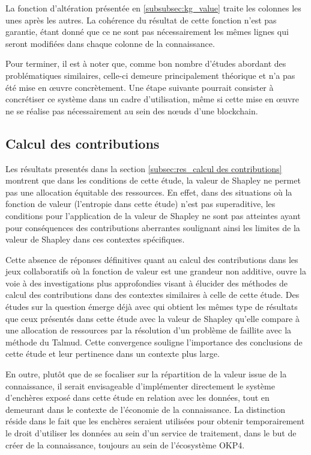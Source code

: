 La fonction d'altération présentée en \ref{subsubsec:kg_value} traite les colonnes les unes après les autres. La cohérence du résultat de cette fonction n'est pas garantie, étant donné que ce ne sont pas nécessairement les mêmes lignes qui seront modifiées dans chaque colonne de la connaissance.

Pour terminer, il est à noter que, comme bon nombre d'études abordant des problématiques similaires, celle-ci demeure principalement théorique et n'a pas été mise en œuvre concrètement. Une étape suivante pourrait consister à concrétiser ce système dans un cadre d'utilisation, même si cette mise en œuvre ne se réalise pas nécessairement au sein des nœuds d'une blockchain.


\subsection{Calcul des contributions} \label{subsec: discuss_contrib}


Les résultats presentés dans la section \ref{subsec:res_calcul des contributions} montrent que dans les conditions de cette étude, la valeur de Shapley ne permet pas une allocation équitable des ressources. En effet, dans des situations où la fonction de valeur (l'entropie dans cette étude) n'est pas superaditive, les conditions pour l'application de la valeur de Shapley ne sont pas atteintes ayant pour conséquences des contributions aberrantes soulignant ainsi les limites de la valeur de Shapley dans ces contextes spécifiques.

Cette absence de réponses définitives quant au calcul des contributions dans les jeux collaboratifs où la fonction de valeur est une grandeur non additive, ouvre la voie à des investigations plus approfondies visant à élucider des méthodes de calcul des contributions dans des contextes similaires à celle de cette étude. Des études sur la question émerge déjà avec \cite{khan_incentive_2023} qui obtient les mêmes type de résultats que ceux présentés dans cette étude avec la valeur de Shapley qu'elle compare à une allocation de ressources par la résolution d'un problème de faillite avec la méthode du Talmud. Cette convergence souligne l'importance des conclusions de cette étude et leur pertinence dans un contexte plus large.

En outre, plutôt que de se focaliser sur la répartition de la valeur issue de la connaissance, il serait envisageable d'implémenter directement le système d'enchères exposé dans cette étude en relation avec les données, tout en demeurant dans le contexte de l'économie de la connaissance. La distinction réside dans le fait que les enchères seraient utilisées pour obtenir temporairement le droit d'utiliser les données au sein d'un service de traitement, dans le but de créer de la connaissance, toujours au sein de l'écosystème OKP4.


